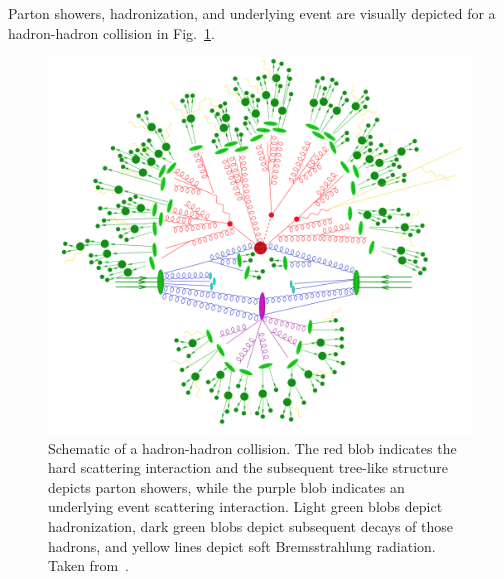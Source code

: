 Parton showers, hadronization, and underlying event are visually depicted for a hadron-hadron collision in Fig.~\ref{fig:pp_event_schematic}.

\begin{figure} [htbp!]
    \centering
    \includegraphics[width=0.7\linewidth]{figures/physics_of_pp/pp_event_schematic.png}
    \caption{Schematic of a hadron-hadron collision. The red blob indicates the hard scattering interaction and the subsequent tree-like structure depicts parton showers, while the purple blob indicates an underlying event scattering interaction. Light green blobs depict hadronization, dark green blobs depict subsequent decays of those hadrons, and yellow lines depict soft Bremsstrahlung radiation. Taken from~\cite{Hoche:2014rga}.}
    \label{fig:pp_event_schematic}
\end{figure}
